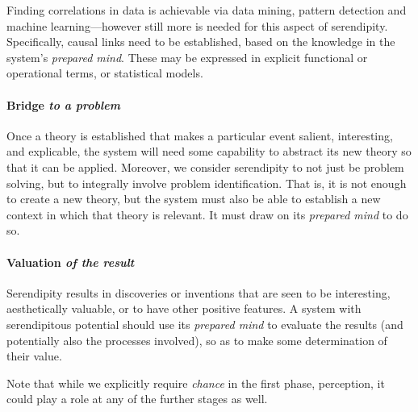 Finding correlations in data is achievable via data mining, pattern detection and machine learning---however still more is needed for this aspect of serendipity.  Specifically, causal links need to be established, based on the knowledge in the system's {\em prepared mind}.  These may be expressed in explicit functional or operational terms, or statistical models.

\paragraph{Bridge \emph{to a problem}}

Once a theory is established that makes a particular event salient, interesting, and explicable, the system will need some capability to abstract its new theory so that it can be applied.  Moreover, we consider serendipity to not just be problem solving, but to integrally involve problem identification.  That is, it is not enough to create a new theory, but the system must also be able to establish a new context in which that theory is relevant.  It must draw on its \emph{prepared mind} to do so.

\paragraph{Valuation \emph{of the result}}

Serendipity results in discoveries or inventions that are seen to be
interesting, aesthetically valuable, or to have other positive
features.  A system with serendipitous potential should use its
\emph{prepared mind} to evaluate the results (and potentially also the
processes involved), so as to make some determination of their value.

\medskip

Note that while we explicitly require \emph{chance} in the first
phase, perception, it could play a role at any of the further stages
as well.





